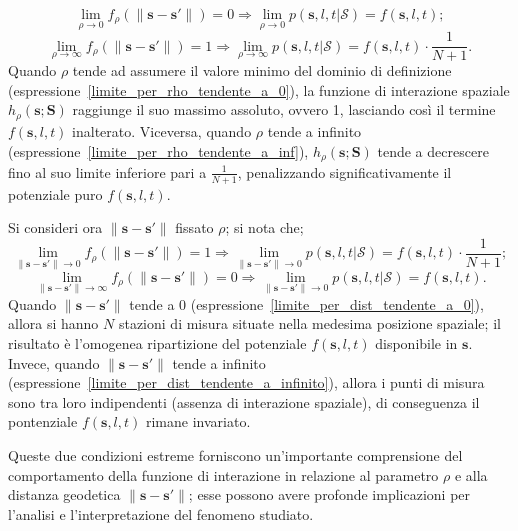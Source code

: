 \begin{equation}
	\lim_{\rho \to 0} f_\rho(\|\mathbf{s} - \mathbf{s}'\|) = 0
		 \Rightarrow \lim_{\rho \to 0} p(\mathbf{s}, l, t| \mathcal{S}) = f(\mathbf{s}, l, t); \label{limite_per_rho_tendente_a_0}
\end{equation}
\begin{equation}
	\lim_{\rho \to \infty} f_\rho(\|\mathbf{s} - \mathbf{s}'\|) = 1
	\Rightarrow \lim_{\rho \to \infty} p(\mathbf{s}, l, t| \mathcal{S}) = f(\mathbf{s}, l, t)\cdot\frac{1}{N + 1} .
	\label{limite_per_rho_tendente_a_inf}
\end{equation}
Quando $\rho$ tende ad assumere il valore minimo del dominio di definizione (espressione~\ref{limite_per_rho_tendente_a_0}), la funzione di interazione spaziale $h_\rho(\mathbf{s};\mathbf{S})$ raggiunge il suo massimo assoluto, ovvero \num{1}, lasciando così il termine $f(\mathbf{s}, l, t)$ inalterato. Viceversa, quando 
$\rho$ tende a infinito (espressione~\ref{limite_per_rho_tendente_a_inf}), $h_\rho(\mathbf{s};\mathbf{S})$ tende a decrescere fino al suo limite inferiore pari a $\frac{1}{N+1}$, penalizzando significativamente il potenziale puro $f(\mathbf{s}, l, t)$.\par Si consideri ora $\|\mathbf{s} - \mathbf{s}'\|$ fissato $\rho$; si nota che;
\begin{equation}
	\lim_{\|\mathbf{s} - \mathbf{s}' \| \to 0} f_\rho(\|\mathbf{s} - \mathbf{s}'\|) = 1
	\Rightarrow \lim_{\|\mathbf{s} - \mathbf{s}' \| \to 0} p(\mathbf{s}, l, t| \mathcal{S}) = f(\mathbf{s}, l, t)\cdot\frac{1}{N+1};
	\label{limite_per_dist_tendente_a_0}
\end{equation}
\begin{equation}
	\lim_{\|\mathbf{s} - \mathbf{s}' \| \to \infty} f_\rho(\|\mathbf{s} - \mathbf{s}'\|) = 0
	\Rightarrow \lim_{\|\mathbf{s} - \mathbf{s}' \| \to 0} p(\mathbf{s}, l, t| \mathcal{S}) = f(\mathbf{s}, l, t).
	\label{limite_per_dist_tendente_a_infinito}
\end{equation}
Quando $\|\mathbf{s} - \mathbf{s}'\|$ tende a \num{0} (espressione~\ref{limite_per_dist_tendente_a_0}), allora si hanno $N$ stazioni di misura situate nella medesima posizione spaziale; il risultato è l'omogenea ripartizione del potenziale $f(\mathbf{s}, l, t)$ disponibile in $\mathbf{s}$. Invece, quando $\|\mathbf{s} - \mathbf{s}'\|$ tende a infinito (espressione~\ref{limite_per_dist_tendente_a_infinito}), allora i punti di misura sono tra loro indipendenti (assenza di interazione spaziale), di conseguenza il pontenziale $f(\mathbf{s}, l, t)$ rimane invariato.
\par Queste due condizioni estreme forniscono un'importante comprensione del comportamento della funzione di interazione in relazione al parametro $\rho$ e alla distanza geodetica $\|\mathbf{s} - \mathbf{s}'\|$; esse possono avere profonde implicazioni per l'analisi e l'interpretazione del fenomeno studiato.

